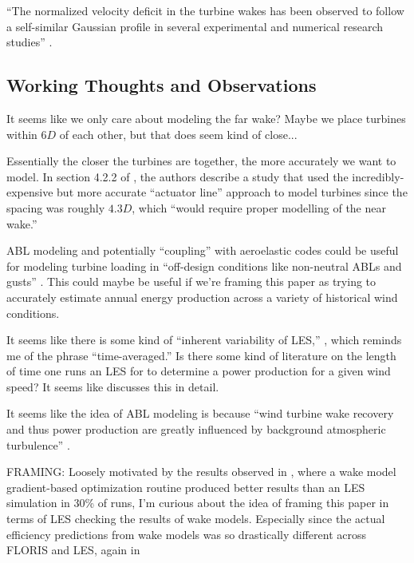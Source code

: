 \documentclass[12pt]{article}
\begin{document}
“The normalized velocity deficit in the turbine wakes has been observed to
follow a self-similar Gaussian profile in several experimental and numerical
research studies” \cite[pg.2]{niayifarAnalyticalModelingWind2016}.


\subsection{Working Thoughts and Observations}
It seems like we only care about modeling the far wake? Maybe we place turbines within $6D$
of each other, but that does seem kind of close...

Essentially the closer the turbines are together, the more accurately we want
to model. In section 4.2.2 of \cite{mehtaLargeEddySimulation2014}, the authors
describe a study that used the incredibly-expensive but more accurate
``actuator line'' approach to model turbines since the spacing was roughly
$4.3D$, which ``would require proper modelling of the near wake.''

ABL modeling and potentially ``coupling'' with aeroelastic codes could be
useful for modeling turbine loading in ``off-design conditions like non-neutral
ABLs and gusts'' \cite{mehtaLargeEddySimulation2014}. This could maybe be useful
if we're framing this paper as trying to accurately estimate annual energy production
across a variety of historical wind conditions.

It seems like there is some kind of ``inherent variability of LES,''
\cite{bretonSurveyModellingMethods2017}, which reminds me of the phrase
``time-averaged.'' Is there some kind of literature on the length of time one
runs an LES for to determine a power production for a given wind speed? It seems like
\cite{andersenQuantifyingVariabilityLarge2015} discusses this in detail.

It seems like the idea of ABL modeling is because ``wind turbine wake recovery
and thus power production are greatly influenced by background atmospheric
turbulence'' \cite[pg.302]{stipaTOSCAOpensourceFinitevolume2024}.


FRAMING: Loosely motivated by the results observed in
\cite{bempedelisDatadrivenOptimisationWind2024}, where a wake model
gradient-based optimization routine produced better results than an LES
simulation in 30\% of runs, I'm curious about the idea of framing this paper in
terms of LES checking the results of wake models. Especially since the actual
efficiency predictions from wake models was so drastically different across
FLORIS and LES, again in \cite{bempedelisDatadrivenOptimisationWind2024}
\end{document}

